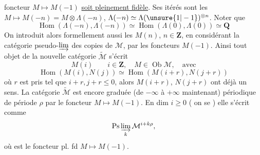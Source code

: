 foncteur $M\mapsto M(-1)$ \uline{soit pleinement fidèle}.
Ses itérés sont les $M\mapsto M(-n)=M\otimes\Lambda(-n)$, $\Lambda(-n)\simeq\Lambda(\unsure{1|-1})^{\otimes n}$.
Noter que
\[
\operatorname{Hom}(\Lambda(-n),\Lambda(-n))\simeq\operatorname{Hom}(\Lambda(0),\Lambda(0))\simeq\mathbf Q
\]
On introduit alors formellement aussi les $M(n)$, $n\in\mathbf Z$, en considérant la catégorie pseudo-$\varinjlim$ des copies de $\mathcal M$, par les foncteurs $M(-1)$. Ainsi tout objet de la nouvelle catégorie $\widetilde{\mathcal M}$  s'écrit
\[
M(i)\qquad i\in\mathbf Z,\quad M\in\operatorname{Ob}\mathcal M,\quad\text{avec}
\]
\[
\operatorname{Hom}(M(i),N(j))\simeq\operatorname{Hom}(M(i+r),N(j+r))
\]
où $r$ est pris tel que $i+r,j+r\leq0$, alors $M(i+r)$, $N(j+r)$ ont déjà un sens.
La catégorie $\widetilde{\mathcal M}$ est encore graduée (de $-\infty$ à $+\infty$ maintenant) périodique de période $\rho$ par le foncteur  $M\mapsto M(-1)$. En dim $i\geq0$ ( on se ) elle s'écrit comme
\[
\operatorname{Ps}\varinjlim_k\mathcal M^{i+k\rho},
\]
où
est le foncteur pl. fd $M\mapsto M(-1)$.
